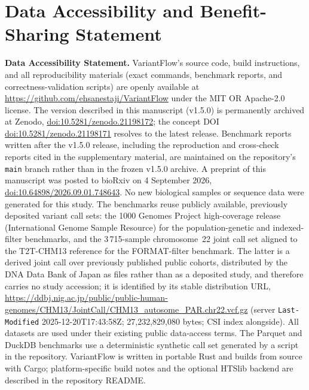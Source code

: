 \documentclass[11pt]{article}
\begin{document}



\section*{Data Accessibility and Benefit-Sharing Statement}

\noindent\textbf{Data Accessibility Statement.} VariantFlow's source code,
build instructions, and all reproducibility materials (exact commands,
benchmark reports, and correctness-validation scripts) are openly available
at \url{https://github.com/ehsanestaji/VariantFlow} under the MIT OR
Apache-2.0 license. The version described in this manuscript (v1.5.0) is
permanently archived at Zenodo,
\href{https://doi.org/10.5281/zenodo.21198172}{doi:10.5281/zenodo.21198172};
the concept DOI \href{https://doi.org/10.5281/zenodo.21198171}{doi:10.5281/zenodo.21198171}
resolves to the latest release. Benchmark reports written after the v1.5.0
release, including the reproduction and cross-check reports cited in the
supplementary material, are maintained on the repository's \texttt{main} branch
rather than in the frozen v1.5.0 archive. A preprint of this manuscript was
posted to bioRxiv on 4 September 2026,
\href{https://doi.org/10.64898/2026.09.01.748643}{doi:10.64898/2026.09.01.748643}.
No new biological samples or sequence data were generated for this study.
The benchmarks reuse publicly available, previously deposited variant call
sets: the 1000 Genomes Project high-coverage release (International Genome
Sample Resource) for the population-genetic and indexed-filter benchmarks, and
the 3\,715-sample chromosome~22 joint call set aligned to the T2T-CHM13
reference for the FORMAT-filter benchmark. The latter is a derived joint call
over previously published public cohorts, distributed by the DNA Data Bank of
Japan as files rather than as a deposited study, and therefore carries no
study accession; it is identified by its stable distribution URL,
\url{https://ddbj.nig.ac.jp/public/public-human-genomes/CHM13/JointCall/CHM13_autosome_PAR.chr22.vcf.gz}
(server \texttt{Last-Modified} 2025-12-20T17:43:58Z; 27{,}232{,}829{,}080 bytes;
CSI index alongside). All datasets are used under their
existing public data-access terms. The Parquet and DuckDB
benchmarks use a deterministic synthetic call set generated by a script in the
repository. VariantFlow is written in
portable Rust and builds from source with Cargo; platform-specific build notes
and the optional HTSlib backend are described in the repository README.
\end{document}
